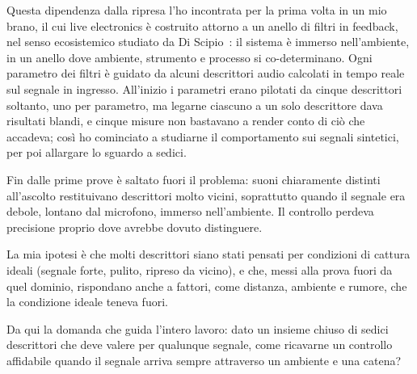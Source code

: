\documentclass{article}
\begin{document}
Questa dipendenza dalla ripresa l'ho incontrata per la prima volta in un mio brano, il cui live electronics è costruito attorno a un anello di filtri in feedback, nel senso ecosistemico studiato da Di Scipio~\cite{discipio2003sound}: il sistema %
è immerso nell'ambiente, in un anello dove ambiente, strumento e processo si co-determinano. Ogni parametro dei filtri è guidato da alcuni descrittori audio calcolati in tempo reale sul segnale in ingresso. All'inizio i parametri erano pilotati da cinque descrittori soltanto, uno per parametro, ma legarne ciascuno a un solo descrittore dava risultati blandi, e cinque misure non bastavano a render conto di ciò che accadeva; così ho cominciato a studiarne il comportamento sui segnali sintetici, per poi allargare lo sguardo a sedici.

Fin dalle prime prove è saltato fuori il problema: suoni chiaramente distinti all'ascolto restituivano descrittori molto vicini, soprattutto quando il segnale era debole, lontano dal microfono, immerso nell'ambiente. Il controllo perdeva precisione proprio dove avrebbe dovuto distinguere.


La mia ipotesi è che molti descrittori siano stati pensati per condizioni di cattura ideali (segnale forte, pulito, ripreso da vicino), e che, messi alla prova fuori da quel dominio, rispondano anche a fattori, come distanza, ambiente e rumore, che la condizione ideale teneva fuori.

Da qui la domanda che guida l'intero lavoro: dato un insieme chiuso di sedici descrittori che deve valere per qualunque segnale, come ricavarne un controllo affidabile quando il segnale arriva sempre attraverso un ambiente e una catena?
\end{document}
